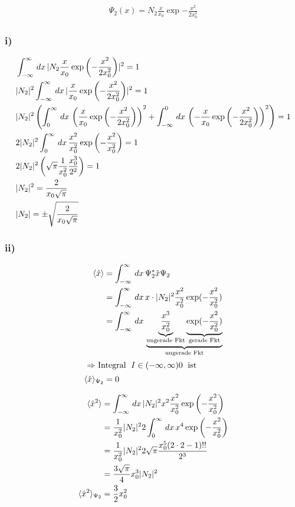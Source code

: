 \begin{align}
    \Psi_2 (x)=N_2 \frac{x}{x_0} \exp{-\frac{x^2}{2x_0^2}}
\end{align}

\subsubsection{i)}

\begin{align}
    &\int_{-\infty}^{\infty}\,dx\, \lvert N_2\frac{x}{x_0}\exp\left(-\frac{x^2}{2x_0^2}\right)\rvert^2=1\\
    &\lvert N_2\rvert^2 \int_{-\infty}^{\infty}\,dx\, \lvert\frac{x}{x_0}\exp\left(-\frac{x^2}{2x_0^2}\right)\rvert^2=1\\
    &\lvert N_2\rvert^2 \left(\int_0^{\infty}\,dx\,\left(\frac{x}{x_0}\exp\left(-\frac{x^2}{2x_0^2}\right)\right)^2+ \int_{-\infty}^0\,dx\,\left(-\frac{x}{x_0} \exp\left(-\frac{x^2}{2x_0^2}\right)\right)^2 \right)=1\\
    &2 \lvert N_2\rvert^2 \int_0^{\infty}\,dx\, \frac{x^2}{x_0^2} \exp\left(-\frac{x^2}{x_0^2}\right)=1\\
    &2 \lvert N_2\rvert^2 \left(\sqrt{\pi} \frac{1}{x_0^2} \frac{x_0^3}{2^2}\right)=1\\
    &\lvert N_2\rvert^2=\frac{2}{x_0\sqrt{\pi}}\\
    &\lvert N_2\rvert= \pm \sqrt{\frac{2}{x_0\sqrt{\pi}}}
\end{align}

\subsubsection{ii)}

\begin{align}
    \langle\hat x \rangle &= \int_{-\infty}^{\infty}\,dx\, \Psi _2^* \hat x \Psi _2\\
    &= \int_{-\infty}^{\infty}\,dx\, x\cdot  \lvert N_2\rvert^2 \frac{x^2}{x_0^2}\exp(-\frac{x^2}{x_0^2})\\
    &=\int_{-\infty}^{\infty}\,dx\, \underbrace{\underbrace{\frac{x^3}{x_0^2}}_{\text{ungerade Fkt}} \underbrace{\exp(-\frac{x^2}{x_0^2})}_{\text{gerade Fkt}}}_{\text{ungerade Fkt}}\\
    \intertext{
        $\Rightarrow $ Integral $\;I \in (-\infty,\infty) 0\; $ ist
    }
    \langle\hat x \rangle_{\Psi_2}&=0
\end{align}

\begin{align}
    \langle\hat x ^2\rangle &= \int_{-\infty}^{\infty}\,dx\, \lvert N_2\rvert^2 x^2 \frac{x^2}{x_0^2} \exp\left(-\frac{x^2}{x_0^2}\right)\\
    &=\frac{1}{x_0^2} \lvert N_2\rvert^2 2 \int_0^{\infty}\,dx\, x^4 \exp\left(-\frac{x^2}{x_0^2}\right)\\
    &=\frac{1}{x_0^2} \lvert N_2\rvert^2 2\sqrt{\pi} \frac{x_0^5(2\cdot2-1)!!}{2^3}\\
    &=\frac{3\sqrt{\pi}}{4}x_0^3 \lvert N_2\rvert^2\\
    \langle\hat x ^2\rangle_{\Psi _2}&= \frac{3}{2} x_0^2
\end{align}


